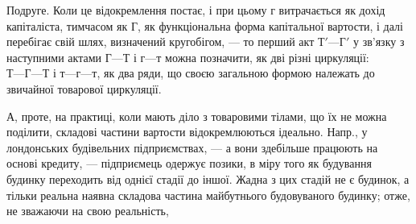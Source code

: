 Подруге. Коли це відокремлення постає, і при цьому г витрачається
як дохід капіталіста, тимчасом як $Г$, як функціональна форма капітальної
вартости, і далі перебігає свій шлях, визначений кругобігом, — то перший
акт $Т' — Г'$ у зв’язку з наступними актами $Г — Т$ і $г — т$ можна позначити,
як дві різні циркуляції: $Т — Г — Т$ і $т — г — т$, як два ряди, що своєю
загальною формою належать до звичайної товарової циркуляції.

А, проте, на практиці, коли мають діло з товаровими тілами, що
їх не можна поділити, складові частини вартости відокремлюються
ідеально. Напр., у лондонських будівельних підприємствах, — а вони здебільше
працюють на основі кредиту, — підприємець одержує позики,
в міру того як будування будинку переходить від однієї стадії до іншої.
Жадна з цих стадій не є будинок, а тільки реальна наявна складова частина
майбутнього будовуваного будинку; отже, не зважаючи на свою реальність,
\parbreak{}  %
